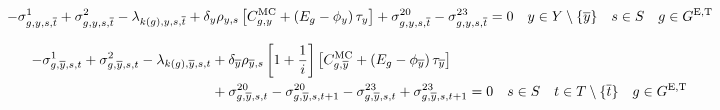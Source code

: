 \documentclass{article}
\begin{document}
\begin{equation}
-\dMinPowerOutput[\iGenerator,\iYear,\iScenario,\iIntervalTerminal] + \dMaxPowerOutputExistingThermal[\iGenerator,\iYear,\iScenario,\iIntervalTerminal] 
- \dPowerBalance[k(\iGenerator),\iYear,\iScenario,\iIntervalTerminal] + \cDiscountRate \cScenarioDuration \left[\cMarginalCost + \left(\cEmissionsIntensity - \vBaseline\right)\vPermitPrice \right] + \dRampRateUp[\iGenerator,\iYear,\iScenario,\iIntervalTerminal] - \dRampRateDown[\iGenerator,\iYear,\iScenario,\iIntervalTerminal] = 0 \quad  \iYear \in \sYears \setminus \{\iYearTerminal\} \quad \iScenario \in \sScenarios \quad \iGenerator \in \sGeneratorsExistingThermal\\
\end{equation}


\begin{align}
-\dMinPowerOutput[\iGenerator,\iYearTerminal,\iScenario,\iInterval] + \dMaxPowerOutputExistingThermal[\iGenerator,\iYearTerminal,\iScenario,\iInterval] - \dPowerBalance[k(\iGenerator),\iYearTerminal,\iScenario,\iInterval] & + \cDiscountRate[\iYearTerminal] \cScenarioDuration[\iYearTerminal,\iScenario] \left[1 + \frac{1}{\cInterestRate}\right] \left[\cMarginalCost[\iGenerator,\iYearTerminal] + \left(\cEmissionsIntensity - \vBaseline[\iYearTerminal]\right)\vPermitPrice[\iYearTerminal] \right] \nonumber\\
& + \dRampRateUp[\iGenerator,\iYearTerminal,\iScenario,\iInterval] - \dRampRateUp[\iGenerator,\iYearTerminal,\iScenario,\iInterval + 1] - \dRampRateDown[\iGenerator,\iYearTerminal,\iScenario,\iInterval] + \dRampRateDown[\iGenerator,\iYearTerminal,\iScenario,\iInterval + 1] = 0 \quad \iScenario \in \sScenarios \quad \iInterval \in \sIntervals \setminus \{\iIntervalTerminal\} \quad \iGenerator \in \sGeneratorsExistingThermal
\nonumber\\
\end{align}
\end{document}
